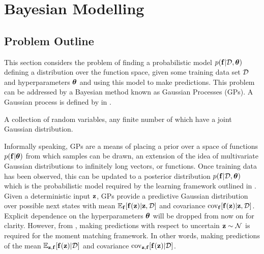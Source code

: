 















\section{Bayesian Modelling} \label{sec:bayesmodelling}%

\subsection{Problem Outline} \label{sec:bayesproblem}
This section considers the problem of finding a probabilistic model $p(\mathbf{f}|\mathcal{D}, \boldsymbol{\theta})$ defining a distribution over the function space, given some training data set $\mathcal{D}$ and hyperparameters $\boldsymbol{\theta}$ and using this model to make predictions. This problem can be addressed by a Bayesian method known as Gaussian Processes (GPs). A Gaussian process  is defined by \cite{RaWi06} in .

\begin{defin} \label{def:GP}
A collection of random variables, any finite number of which have a joint Gaussian distribution.
\end{defin}
%
Informally speaking, GPs are a means of placing a prior over a space of functions $p(\mathbf{f}|\boldsymbol{\theta})$ from which samples can be drawn, an extension of the idea of multivariate Gaussian distributions to infinitely long vectors, or functions. Once training data has been observed, this can be updated to a posterior distribution $p(\mathbf{f}|\mathcal{D},\boldsymbol{\theta})$ which is the probabilistic model required by the learning framework outlined in .
%
Given a deterministic input $\mathbf{z}$, GPs provide a predictive Gaussian distribution over possible next states with mean $\mathbb{E}_{\mathbf{f}}[\mathbf{f}(\mathbf{z})|\mathbf{z},\mathcal{D}]$ and covariance $\mathrm{cov}_{\mathbf{f}}[\mathbf{f}(\mathbf{z})|\mathbf{z},\mathcal{D}]$. Explicit dependence on the hyperparameters $\boldsymbol{\theta}$ will be dropped from now on for clarity. However, from , making predictions with respect to uncertain $\mathbf{z} \sim \mathcal{N}$ is required for the moment matching framework. In other words, making predictions of the mean $\mathbb{E}_{\mathbf{z},\mathbf{f}}[\mathbf{f}(\mathbf{z})|\mathcal{D}]$ and covariance $\mathrm{cov}_{\mathbf{z},\mathbf{f}}[\mathbf{f}(\mathbf{z})|\mathcal{D}]$.



